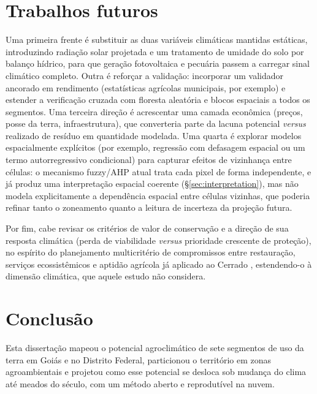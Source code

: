 \section{Trabalhos futuros}\label{sec:futurework}

Uma primeira frente é substituir as duas variáveis climáticas mantidas estáticas, introduzindo
radiação solar projetada e um tratamento de umidade do solo por balanço hídrico, para que
geração fotovoltaica e pecuária passem a carregar sinal climático completo. Outra é reforçar a
validação: incorporar um validador ancorado em rendimento (estatísticas agrícolas municipais, por
exemplo) e estender a verificação cruzada com floresta aleatória e blocos espaciais a todos os
segmentos.
Uma terceira direção é acrescentar uma camada econômica (preços, posse da terra, infraestrutura),
que converteria parte da lacuna potencial \emph{versus} realizado de resíduo em quantidade modelada.
Uma quarta é explorar modelos espacialmente explícitos (por exemplo, regressão com defasagem
espacial ou um termo autorregressivo condicional) para capturar efeitos de vizinhança entre
células: o mecanismo fuzzy/AHP atual trata cada pixel de forma independente, e já produz uma
interpretação espacial coerente (\S\ref{sec:interpretation}), mas não modela explicitamente a
dependência espacial entre células vizinhas, que poderia refinar tanto o zoneamento quanto a
leitura de incerteza da projeção futura.

Por fim, cabe revisar os critérios de
valor de conservação e a direção de sua resposta climática (perda de viabilidade \emph{versus}
prioridade crescente de proteção), no espírito do planejamento multicritério de compromissos entre
restauração, serviços ecossistêmicos e aptidão agrícola já aplicado ao Cerrado
\citep{schuler_spatial_2022}, estendendo-o à dimensão climática, que aquele estudo não considera.

\section{Conclusão}\label{sec:conclusion}

Esta dissertação mapeou o potencial agroclimático de sete segmentos de uso da terra em Goiás e
no Distrito Federal, particionou o território em zonas agroambientais e projetou como esse
potencial se desloca sob mudança do clima até meados do século, com um método aberto e
reprodutível na nuvem.

